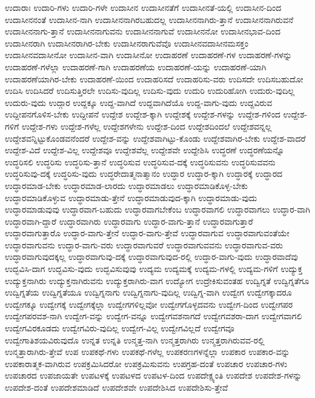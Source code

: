{ಉದಾರಾಃ
ಉದಾರಿ-ಗಳು
ಉದಾರಿ-ಗಳೇ
ಉದಾಸೀನ
ಉದಾಸೀನತೆಗೆ
ಉದಾಸೀನತೆ-ಯಲ್ಲಿ
ಉದಾಸೀನ-ದಿಂದ
ಉದಾಸೀನನಂತೆ
ಉದಾಸೀನ-ನಾಗಿ
ಉದಾಸೀನನಾಗಿರಬಹುದಲ್ಲ
ಉದಾಸೀನನಾಗಿರು-ತ್ತಾನೆ
ಉದಾಸೀನನಾಗಿರುವನೆ
ಉದಾಸೀನನಾಗು-ತ್ತಾನೆ
ಉದಾಸೀನನಾಗುವನು
ಉದಾಸೀನನಾಗುವೆ
ಉದಾಸೀನನೋ
ಉದಾಸೀನಭಾವ-ದಿಂದ
ಉದಾಸೀನರಾಗಿ
ಉದಾಸೀನರಾಗಿರ-ಬೇಕು
ಉದಾಸೀನರಾಗುವೆವೊ
ಉದಾಸೀನವದಾಸೀನಮಸಕ್ತಂ
ಉದಾಸೀನವದಾಸೀನೋ
ಉದಾಸೀನ-ವಾಗಿ
ಉದಾಸೀನೋ
ಉದಾಹರಣೆ
ಉದಾಹರಣೆ-ಗಳ
ಉದಾಹರಣೆ-ಗಳನ್ನು
ಉದಾಹರಣೆ-ಗಳೆಲ್ಲಾ
ಉದಾಹರಣೆ-ಗಾಗಿ
ಉದಾಹರಣೆಯ
ಉದಾಹರಣೆ-ಯನ್ನು
ಉದಾಹರಣೆ-ಯಾಗಿ
ಉದಾಹರಣೆಯಾಗಿರ-ಬೇಕು
ಉದಾಹರಣೆ-ಯಿಂದ
ಉದಾಹರಿಸದೆ
ಉದಾಹರಿಸು-ವರು
ಉದಿಸದೇ
ಉದಿಸಬಹುದೋ
ಉದಿಸಿ
ಉದಿಸಿದರೆ
ಉದಿಸುತ್ತಿರಲೇ
ಉದಿಸು-ವುದಿಲ್ಲ
ಉದಿಸು-ವುದು
ಉದುರಿ
ಉದುರಿಹೋಗಿ
ಉದುರು-ವುದಿಲ್ಲ
ಉದುರು-ವುದು
ಉದ್ಗಾರ
ಉದ್ದಕ್ಕೂ
ಉದ್ದ-ವಾಗಿದೆ
ಉದ್ದವಾಗಿದೆಯೊ
ಉದ್ದ-ವಾಗು-ವುದು
ಉದ್ದವಿರುವ
ಉದ್ದೀಪನಗೊಳಿಸ-ಬೇಕು
ಉದ್ದೀಪನೆ
ಉದ್ದೇಶ
ಉದ್ದೇಶ-ಕ್ಕಾಗಿ
ಉದ್ದೇಶಕ್ಕೆ
ಉದ್ದೇಶ-ಗಳನ್ನು
ಉದ್ದೇಶ-ಗಳಿಂದ
ಉದ್ದೇಶ-ಗಳಿಗೆ
ಉದ್ದೇಶ-ಗಳು
ಉದ್ದೇಶ-ಗಳೆಲ್ಲ
ಉದ್ದೇಶಗಳೇನು
ಉದ್ದೇಶ-ದಿಂದ
ಉದ್ದೇಶದಿಂದಲೆ
ಉದ್ದೇಶವನ್ನಲ್ಲ
ಉದ್ದೇಶವನ್ನಿಟ್ಟುಕೊಂಡವನೆಂದರೆ
ಉದ್ದೇಶ-ವನ್ನು
ಉದ್ದೇಶವಾಗಿಟ್ಟು-ಕೊಂಡು
ಉದ್ದೇಶವಾಗಿರ-ಬೇಕು
ಉದ್ದೇಶ-ವಾದರೆ
ಉದ್ದೇಶ-ವಿದೆ
ಉದ್ದೇಶ-ವಿಲ್ಲ
ಉದ್ದೇಶವೂ
ಉದ್ದೇಶವೆಲ್ಲ
ಉದ್ದೇಶವೇ
ಉದ್ದೇಶಿಸಿ
ಉದ್ಧರಣೆ
ಉದ್ಧರಣೆಯನ್ನೊ
ಉದ್ಧರಿಸಲಿ
ಉದ್ಧರಿಸು
ಉದ್ಧರಿಸು-ತ್ತಾನೆ
ಉದ್ಧರಿಸುವ
ಉದ್ಧರಿಸುವ-ದಕ್ಕೆ
ಉದ್ಧರಿಸುವನು
ಉದ್ಧರಿಸುವವನು
ಉದ್ಧರಿಸುವು-ದಕ್ಕೆ
ಉದ್ಧರಿಸು-ವುದು
ಉದ್ಧರೇದಾತ್ಮನಾತ್ಮಾನಂ
ಉದ್ಧಾರ
ಉದ್ಧಾರ-ಕ್ಕಾಗಿ
ಉದ್ಧಾರಕ್ಕೆ
ಉದ್ಧಾರದ
ಉದ್ಧಾರಮಾಡ-ಬೇಕು
ಉದ್ಧಾರಮಾಡ-ಲಾರದು
ಉದ್ಧಾರಮಾಡಲು
ಉದ್ಧಾರಮಾಡಿಕೊಳ್ಳ-ಬೇಕು
ಉದ್ಧಾರಮಾಡಿಕೊಳ್ಳುವ
ಉದ್ಧಾರಮಾಡು-ತ್ತೇನೆ
ಉದ್ಧಾರಮಾಡುವುದ-ಕ್ಕಾಗಿ
ಉದ್ಧಾರಮಾಡು-ವುದು
ಉದ್ಧಾರಮಾಡುವುವು
ಉದ್ಧಾರವಾಗ-ಬಹುದು
ಉದ್ಧಾರವಾಗಬೇಕೆಂಬ
ಉದ್ಧಾರವಾಗಲಿ
ಉದ್ಧಾರವಾಗಲು
ಉದ್ಧಾರ-ವಾಗಿ
ಉದ್ಧಾರವಾಗಿ-ದ್ದಾರೆ
ಉದ್ಧಾರವಾಗಿರು
ಉದ್ಧಾರವಾಗು
ಉದ್ಧಾರ-ವಾಗು-ತ್ತಾನೆ
ಉದ್ಧಾರವಾಗುತ್ತಾರೆ
ಉದ್ಧಾರವಾಗುತ್ತಾರೊ
ಉದ್ಧಾರ-ವಾಗು-ತ್ತೇನೆ
ಉದ್ಧಾರ-ವಾಗು-ತ್ತೇವೆ
ಉದ್ಧಾರವಾಗುವ
ಉದ್ಧಾರವಾಗುವಂತೆಯೇ
ಉದ್ಧಾರವಾಗುವನು
ಉದ್ಧಾರ-ವಾಗು-ವರು
ಉದ್ಧಾರವಾಗುವರೆ
ಉದ್ಧಾರವಾಗುವವನು
ಉದ್ಧಾರವಾಗುವ-ವರು
ಉದ್ಧಾರವಾಗುವುದಕ್ಕಲ್ಲ
ಉದ್ಧಾರವಾಗುವು-ದಕ್ಕೆ
ಉದ್ಧಾರವಾಗುವುದ-ರಲ್ಲಿ
ಉದ್ಧಾರ-ವಾಗು-ವುದು
ಉದ್ಧಾರವಾದೆವು
ಉದ್ಭವಿಸಿ-ದಾಗ
ಉದ್ಭವಿಸು-ವುದು
ಉದ್ಭವಿಸುವುವು
ಉದ್ಯಮ
ಉದ್ಯಮಕ್ಕೆ
ಉದ್ಯಮ-ಗಳಲ್ಲಿ
ಉದ್ಯಮ-ಗಳಿಗೆ
ಉದ್ಯುಕ್ತ
ಉದ್ಯುಕ್ತನಾಗಿರು
ಉದ್ಯುಕ್ತನಾಗಿರುವನು
ಉದ್ಯುಕ್ತರಾಗಿರು-ವಾಗ
ಉದ್ಯೋಗ
ಉದ್ರೇಕಿಸುವಂತಹ
ಉದ್ವಿಗ್ನತೆ
ಉದ್ವಿಗ್ನತೆಗೂ
ಉದ್ವಿಗ್ನತೆಯ
ಉದ್ವಿಗ್ನತೆಯೂ
ಉದ್ವಿಗ್ನನಾಗು
ಉದ್ವಿಗ್ನನಾಗು-ವುದಿಲ್ಲ
ಉದ್ವಿಗ್ನ-ವಾಗಿ
ಉದ್ವೇಗ
ಉದ್ವೇಗಕ್ಕಾದರೂ
ಉದ್ವೇಗಕ್ಕೂ
ಉದ್ವೇಗಕ್ಕೆ
ಉದ್ವೇಗಕ್ಕೆಲ್ಲಾ
ಉದ್ವೇಗಗಳಿಲ್ಲವೋ
ಉದ್ವೇಗಗೊಳ್ಳದವನು
ಉದ್ವೇಗ-ದಿಂದ
ಉದ್ವೇಗಪರ
ಉದ್ವೇಗಪರವಶ-ನಾಗಿ
ಉದ್ವೇಗ-ವನ್ನು
ಉದ್ವೇಗ-ವನ್ನೂ
ಉದ್ವೇಗವಶನಾಗದೆ
ಉದ್ವೇಗವಶರಾ-ದಾಗ
ಉದ್ವೇಗವಾಗಲಿ
ಉದ್ವೇಗವಿರಕೂಡದು
ಉದ್ವೇಗವಿರು-ವುದಿಲ್ಲ
ಉದ್ವೇಗ-ವಿಲ್ಲ
ಉದ್ವೇಗವಿಲ್ಲದೆ
ಉದ್ವೇಗವೂ
ಉದ್ವೇಗಾತಿಶಯವಿರುವುದೊ
ಉನ್ನತ
ಉನ್ನತಿ
ಉನ್ಮತ್ತ-ನಾಗಿ
ಉನ್ಮತ್ತರಾಗಿರು
ಉನ್ಮತ್ತರಾಗಿರುವವ-ರಲ್ಲಿ
ಉನ್ಮತ್ತಾರಾಗಿರು-ತ್ತೇವೆ
ಉಪ
ಉಪಕಥೆ-ಗಳು
ಉಪಕಥೆ-ಗಳೆಲ್ಲ
ಉಪಕರಣಗಳನ್ನೆಲ್ಲಾ
ಉಪಕಾರ
ಉಪಕಾರ-ವನ್ನು
ಉಪಕಾರಾತ್ಮಕ-ವಾಗಿರುವ
ಉಪಕ್ರಮಿಸಿದರೋ
ಉಪಕ್ರಮಿಸುವನು
ಉಪಗ್ರಹ-ದಂತೆ
ಉಪಚಾರ
ಉಪಚಾರ-ಗಳು
ಉಪಚಾರದ
ಉಪಜಾಯತೇ
ಉಪಟಳಕ್ಕೆ
ಉಪಟಳದ
ಉಪಟಳ-ದಿಂದ
ಉಪದೇಕ್ಷ್ಯಂತಿ
ಉಪದೇಶ
ಉಪದೇಶ-ಗಳನ್ನು
ಉಪದೇಶ-ದಂತೆ
ಉಪದೇಶಮಾಡಿದೆ
ಉಪದೇಶವೇ
ಉಪದೇಶಿಸಿದ
ಉಪದೇಶಿಸು-ತ್ತೇವೆ
}

